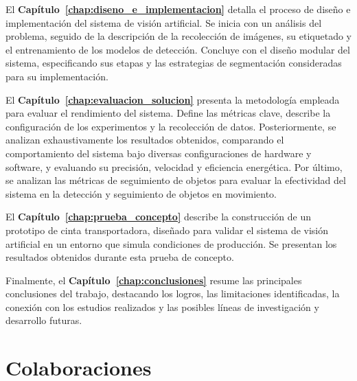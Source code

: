 \documentclass[11pt,spanish,listoffigures,listoftables]{tfgetsinf}
\begin{document}
El \textbf{Capítulo~\ref{chap:diseno_e_implementacion}} detalla el proceso de diseño e implementación del sistema de visión artificial. Se inicia con un análisis del problema, seguido de la descripción de la recolección de imágenes, su etiquetado y el entrenamiento de los modelos de detección. Concluye con el diseño modular del sistema, especificando sus etapas y las estrategias de segmentación consideradas para su implementación.

El \textbf{Capítulo~\ref{chap:evaluacion_solucion}} presenta la metodología empleada para evaluar el rendimiento del sistema. Define las métricas clave, describe la configuración de los experimentos y la recolección de datos. Posteriormente, se analizan exhaustivamente los resultados obtenidos, comparando el comportamiento del sistema bajo diversas configuraciones de hardware y software, y evaluando su precisión, velocidad y eficiencia energética. Por último, se analizan las métricas de seguimiento de objetos para evaluar la efectividad del sistema en la detección y seguimiento de objetos en movimiento.

El \textbf{Capítulo~\ref{chap:prueba_concepto}} describe la construcción de un prototipo de cinta transportadora, diseñado para validar el sistema de visión artificial en un entorno que simula condiciones de producción. Se presentan los resultados obtenidos durante esta prueba de concepto.


Finalmente, el \textbf{Capítulo~\ref{chap:conclusiones}} resume las principales conclusiones del trabajo, destacando los logros, las limitaciones identificadas, la conexión con los estudios realizados y las posibles líneas de investigación y desarrollo futuras.




\section{Colaboraciones}
\end{document}
